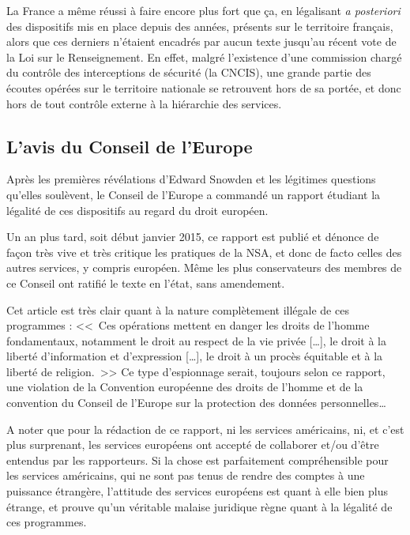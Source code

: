 La France a même réussi à faire encore plus fort que ça, en
légalisant \emph{a posteriori} des dispositifs mis en place depuis des années,
présents sur le territoire français, alors que ces derniers n'étaient encadrés
par aucun texte jusqu'au récent vote de la Loi sur le
Renseignement.\cite{mediapart} En effet, malgré l'existence d'une
commission chargé du contrôle des interceptions de sécurité (la CNCIS), une
grande partie des écoutes opérées sur le territoire nationale se retrouvent
hors de sa portée, et donc hors de tout contrôle externe à la hiérarchie des
services.

\subsection{L'avis du Conseil de l'Europe}

Après les premières révélations d'Edward Snowden et les légitimes
questions qu'elles soulèvent, le Conseil de l'Europe a commandé un rapport
étudiant la légalité de ces dispositifs au regard du droit européen.

Un an plus tard, soit début janvier 2015, ce rapport est
publié\cite{rapport} et dénonce de façon très vive et très critique les
pratiques de la NSA, et donc de facto celles des autres services, y compris européen. Même les plus
conservateurs des membres de ce Conseil ont ratifié le texte en l'état, sans
amendement. 

Cet article est très clair quant à la nature complètement illégale
de ces programmes : <<~Ces opérations mettent en danger les droits de l'homme
fondamentaux, notamment le droit au respect de la vie privée […], le droit à la
liberté d'information et d'expression […], le droit à un procès équitable et à
la liberté de religion.~>> Ce type d'espionnage serait, toujours selon ce
rapport, une violation de la Convention européenne des droits de l'homme et
de la convention du Conseil de l'Europe sur la protection des données
personnelles\ldots 

\newpage
A noter que pour la rédaction de ce rapport, ni les services
américains, ni, et c'est plus surprenant, les services européens ont accepté de
collaborer et/ou d'être entendus par les rapporteurs. Si la chose est
parfaitement compréhensible pour les services américains, qui ne sont pas tenus
de rendre des comptes à une puissance étrangère, l'attitude des services
européens est quant à elle bien plus étrange, et prouve qu'un véritable malaise
juridique règne quant à la légalité de ces programmes.


